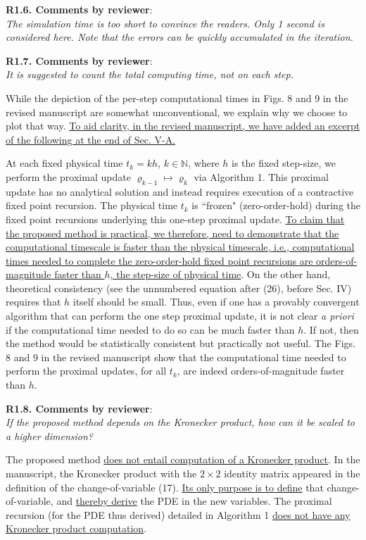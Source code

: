 \documentclass[12pt,onecolumn]{IEEEtran}
\newcommand{\blue}{\color{blue}}
\newcommand{\red}{\textcolor{red}}
\newcommand{\nib}{\noindent  {\bf Response:} }
\begin{document}
\noindent
{\bf R1.6. Comments by reviewer}:\\
{\em The simulation time is too short to convince the readers. Only 1 second is considered here. Note that the errors can be quickly accumulated in the iteration.}

{\nib{ \blue {\red{TBD.}}}}


\noindent
{\bf R1.7. Comments by reviewer}:\\
{\em It is suggested to count the total computing time, not on each step.}

{\nib{ \blue While the depiction of the per-step computational times in Figs. 8 and 9 in the revised manuscript are somewhat unconventional, we explain why we choose to plot that way. \ul{To aid clarity, in the revised manuscript, we have added an excerpt of the following at the end of Sec. V-A.}

At each fixed physical time $t_{k}=kh$, $k\in\mathbb{N}$, where $h$ is the fixed step-size, we perform the proximal update $\varrho_{k-1}\mapsto\varrho_{k}$ via Algorithm 1. This proximal update has no analytical solution and instead requires execution of a contractive fixed point recursion. The physical time $t_{k}$ is ``frozen" (zero-order-hold) during the fixed point recursions underlying this one-step proximal update. \ul{To claim that the proposed method is practical, we therefore, need to demonstrate that the computational timescale is faster than the physical timescale, i.e., computational times needed to complete the zero-order-hold fixed point recursions are orders-of-magnitude faster than $h$, the step-size of physical time}. On the other hand, theoretical consistency (see the unnumbered equation after (26), before Sec. IV) requires that $h$ itself should be small. Thus, even if one has a provably convergent algorithm that can perform the one step proximal update, it is not clear \emph{a priori} if the computational time needed to do so can be much faster than $h$. If not, then the method would be statistically consistent but practically not useful. The Figs. 8 and 9 in the revised manuscript show that the computational time needed to perform the proximal updates, for all $t_{k}$, are indeed orders-of-magnitude faster than $h$.}}


\noindent
{\bf R1.8. Comments by reviewer}:\\
{\em If the proposed method depends on the Kronecker product, how can it be scaled to a higher dimension?}

{\nib{ \blue The proposed method \ul{does not entail computation of a Kronecker product}. In the manuscript, the Kronecker product with the $2\times 2$ identity matrix appeared in the definition of the change-of-variable (17). \ul{Its only purpose is to define} that change-of-variable, and \ul{thereby derive} the PDE in the new variables. The proximal recursion (for the PDE thus derived) detailed in Algorithm 1 \ul{does not have any Kronecker product computation}.}}
\end{document}
